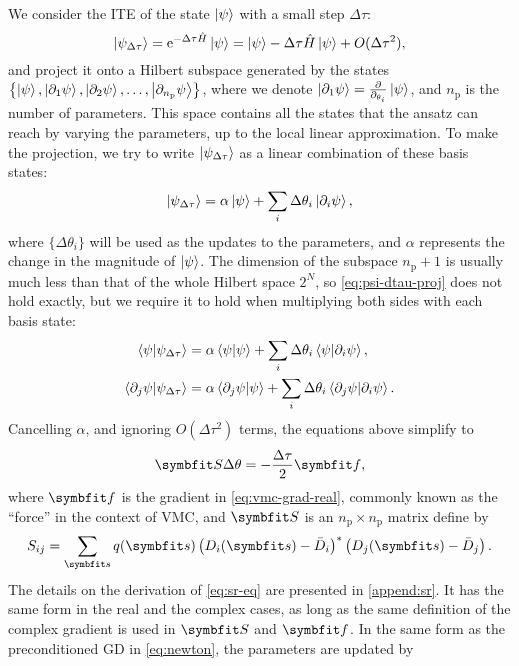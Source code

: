 We consider the ITE of the state $\ket{\psi}$ with a small step $\Delta \tau$:
\begin{equation}
\ket{\psi_{\Delta \tau}} = \mathrm{e}^{-\Delta \tau \hat{H}} \ket{\psi} = \ket{\psi} - \Delta \tau \hat{H} \ket{\psi} + O(\Delta \tau^2),
\end{equation}
and project it onto a Hilbert subspace generated by the states $\left\{ \ket{\psi}, \ket{\partial_1 \psi}, \ket{\partial_2 \psi}, \ldots, \ket{\partial_{n_\text{p}} \psi} \right\}$, where we denote $\ket{\partial_1 \psi} = \frac{\partial}{\partial_{\theta_i}} \ket{\psi}$, and $n_\text{p}$ is the number of parameters. This space contains all the states that the ansatz can reach by varying the parameters, up to the local linear approximation. To make the projection, we try to write $\ket{\psi_{\Delta \tau}}$ as a linear combination of these basis states:
\begin{equation}
\ket{\psi_{\Delta \tau}} = \alpha \ket{\psi} + \sum_i \Delta \theta_i \ket{\partial_i \psi},
\label{eq:psi-dtau-proj}
\end{equation}
where $\{\Delta \theta_i\}$ will be used as the updates to the parameters, and $\alpha$ represents the change in the magnitude of $\ket{\psi}$. The dimension of the subspace $n_\text{p} + 1$ is usually much less than that of the whole Hilbert space $2^N$, so \cref{eq:psi-dtau-proj} does not hold exactly, but we require it to hold when multiplying both sides with each basis state:
\begin{align}
\ip{\psi}{\psi_{\Delta \tau}} &= \alpha \ip{\psi} + \sum_i \Delta \theta_i \ip{\psi}{\partial_i \psi}, \label{eq:sr-eq-1} \\
\ip{\partial_j \psi}{\psi_{\Delta \tau}} &= \alpha \ip{\partial_j \psi}{\psi} + \sum_i \Delta \theta_i \ip{\partial_j \psi}{\partial_i \psi}. \label{eq:sr-eq-2}
\end{align}
Cancelling $\alpha$, and ignoring $O(\Delta \tau^2)$ terms, the equations above simplify to
\begin{equation}
\mS \Delta \theta = -\frac{\Delta \tau}{2} \vf,
\label{eq:sr-eq}
\end{equation}
where $\vf$ is the gradient in \cref{eq:vmc-grad-real}, commonly known as the ``force'' in the context of VMC, and $\mS$ is an $n_\text{p} \times n_\text{p}$ matrix define by
\begin{equation}
S_{i j} = \sum_\vs q(\vs) \left( D_i(\vs) - \bar{D}_i \right)^* \left( D_j(\vs) - \bar{D}_j \right).
\label{eq:qgt}
\end{equation}
The details on the derivation of \cref{eq:sr-eq} are presented in \cref{append:sr}. It has the same form in the real and the complex cases, as long as the same definition of the complex gradient is used in $\mS$ and $\vf$. In the same form as the preconditioned GD in \cref{eq:newton}, the parameters are updated by
